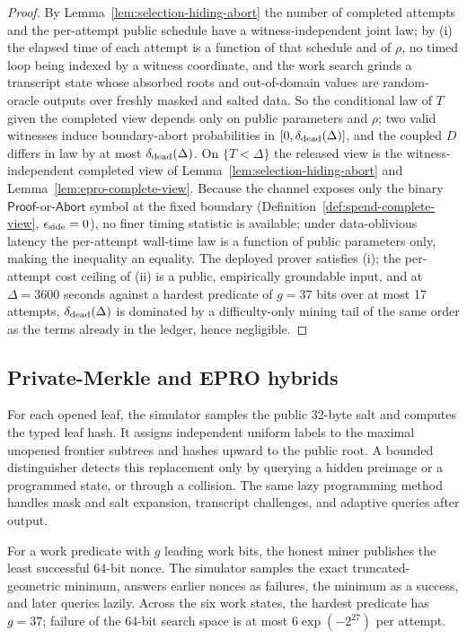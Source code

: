 \begin{proof}
By Lemma~\ref{lem:selection-hiding-abort} the number of completed attempts and
the per-attempt public schedule have a witness-independent joint law; by (i) the
elapsed time of each attempt is a function of that schedule and of \(\rho\), no
timed loop being indexed by a witness coordinate, and the work search grinds a
transcript state whose absorbed roots and out-of-domain values are
random-oracle outputs over freshly masked and salted data.  So the conditional
law of \(T\) given the completed view depends only on public parameters and
\(\rho\); two valid witnesses induce boundary-abort probabilities in
\([0,\delta_{\rm dead}(\Delta)]\), and the coupled \(D\) differs in law by at
most \(\delta_{\rm dead}(\Delta)\).  On \(\{T<\Delta\}\) the released view is the
witness-independent completed view of Lemma~\ref{lem:selection-hiding-abort} and
Lemma~\ref{lem:epro-complete-view}.  Because the channel exposes only the binary
\(\mathsf{Proof}\)-or-\(\mathsf{Abort}\) symbol at the fixed boundary
(Definition~\ref{def:spend-complete-view}, \(\epsilon_{\rm side}=0\)), no finer
timing statistic is available; under data-oblivious latency the per-attempt
wall-time law is a function of public parameters only, making the inequality an
equality.  The deployed prover satisfies (i); the per-attempt cost ceiling of
(ii) is a public, empirically groundable input, and at \(\Delta=3600\) seconds
against a hardest predicate of \(g=37\) bits over at most 17 attempts,
\(\delta_{\rm dead}(\Delta)\) is dominated by a difficulty-only mining tail of
the same order as the terms already in the ledger, hence negligible.
\end{proof}

\subsection{Private-Merkle and EPRO hybrids}

For each opened leaf, the simulator samples the public 32-byte salt and
computes the typed leaf hash.  It assigns independent uniform labels to the
maximal unopened frontier subtrees and hashes upward to the public root.  A
bounded distinguisher detects this replacement only by querying a hidden
preimage or a programmed state, or through a collision.  The same lazy
programming method handles mask and salt expansion, transcript challenges,
and adaptive queries after output.

For a work predicate with \(g\) leading work bits, the honest miner publishes
the least successful 64-bit nonce.  The simulator samples the exact
truncated-geometric minimum, answers earlier nonces as failures, the minimum
as a success, and later queries lazily.  Across the six work states, the
hardest predicate has \(g=37\); failure of the 64-bit search space is at most
\(6\exp(-2^{27})\) per attempt.

